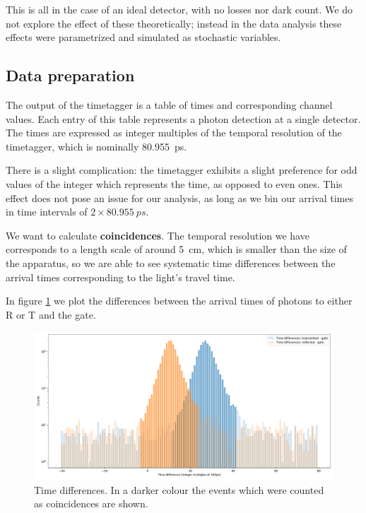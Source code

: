 \documentclass[main.tex]{subfiles}
\begin{document}
This is all in the case of an ideal detector, with no losses nor dark count. We do not explore the effect of these theoretically; instead in the data analysis these effects were parametrized and simulated as stochastic variables. 

\subsection{Data preparation}

The output of the timetagger is a table of times and corresponding channel values.
Each entry of this table represents a photon detection at a single detector.
The times are expressed as integer multiples of the temporal resolution of the timetagger, which is nominally \SI{80.955}{ps}.

There is a slight complication: the timetagger exhibits a slight preference for odd values of the integer which represents the time, as opposed to even ones. This effect does not pose an issue for our analysis, as long as we bin our arrival times in time intervals of \(2 \times \SI{80.955}{ps}\). 

We want to calculate \textbf{coincidences}. The temporal resolution we have corresponds to a length scale of around \SI{5}{cm}, which is smaller than the size of the apparatus, so we are able to see systematic time differences between the arrival times corresponding to the light's travel time. 

In figure \ref{fig:single_photon_timedifferences} we plot the differences between the arrival times of photons to either R or T and the gate. 

\begin{figure}[ht]
\centering
\includegraphics[width=\textwidth]{figures/single_photon_timedifferences}
\caption{Time differences. In a darker colour the events which were counted as coincidences are shown.}
\label{fig:single_photon_timedifferences}
\end{figure}
\end{document}
